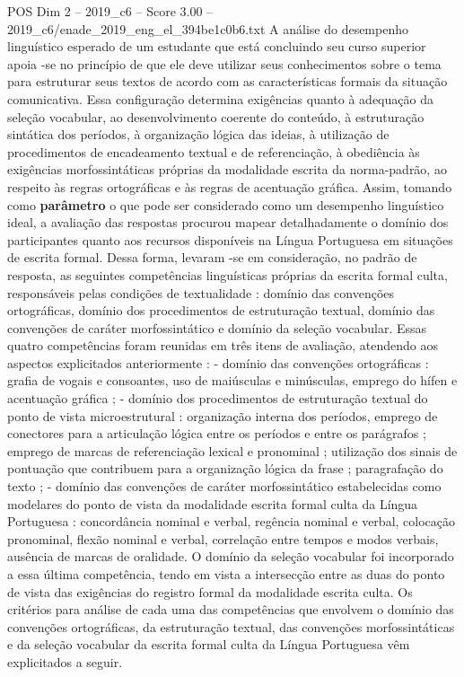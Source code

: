 \begin{textsample}{POS Dim 2 – 2019\_c6 – Score 3.00 – 2019\_c6/enade\_2019\_eng\_el\_394be1c0b6.txt}
A análise do desempenho linguístico esperado de um estudante que está concluindo seu curso superior apoia -se no princípio de que ele deve utilizar seus conhecimentos sobre o tema para estruturar seus textos de acordo com as características formais da situação comunicativa.
Essa configuração determina exigências quanto à adequação da seleção vocabular, ao desenvolvimento coerente do conteúdo, à estruturação sintática dos períodos, à organização lógica das ideias, à utilização de procedimentos de encadeamento textual e de referenciação, à obediência às exigências morfossintáticas próprias da modalidade escrita da norma-padrão, ao respeito às regras ortográficas e às regras de acentuação gráfica.
Assim, tomando como \textbf{parâmetro} o que pode ser considerado como um desempenho linguístico ideal, a avaliação das respostas procurou mapear detalhadamente o domínio dos participantes quanto aos recursos disponíveis na Língua Portuguesa em situações de escrita formal.
Dessa forma, levaram -se em consideração, no padrão de resposta, as seguintes competências linguísticas próprias da escrita formal culta, responsáveis pelas condições de textualidade : domínio das convenções ortográficas, domínio dos procedimentos de estruturação textual, domínio das convenções de caráter morfossintático e domínio da seleção vocabular.
Essas quatro competências foram reunidas em três itens de avaliação, atendendo aos aspectos explicitados anteriormente : - domínio das convenções ortográficas : grafia de vogais e consoantes, uso de maiúsculas e minúsculas, emprego do hífen e acentuação gráfica ; - domínio dos procedimentos de estruturação textual do ponto de vista microestrutural : organização interna dos períodos, emprego de conectores para a articulação lógica entre os períodos e entre os parágrafos ; emprego de marcas de referenciação lexical e pronominal ; utilização dos sinais de pontuação que contribuem para a organização lógica da frase ; paragrafação do texto ; - domínio das convenções de caráter morfossintático estabelecidas como modelares do ponto de vista da modalidade escrita formal culta da Língua Portuguesa : concordância nominal e verbal, regência nominal e verbal, colocação pronominal, flexão nominal e verbal, correlação entre tempos e modos verbais, ausência de marcas de oralidade.
O domínio da seleção vocabular foi incorporado a essa última competência, tendo em vista a intersecção entre as duas do ponto de vista das exigências do registro formal da modalidade escrita culta.
Os critérios para análise de cada uma das competências que envolvem o domínio das convenções ortográficas, da estruturação textual, das convenções morfossintáticas e da seleção vocabular da escrita formal culta da Língua Portuguesa vêm explicitados a seguir.

\end{textsample}
